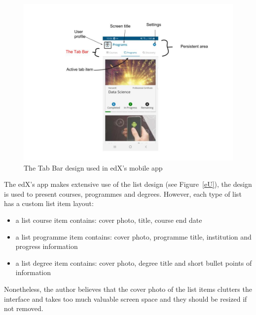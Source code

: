 \documentclass[version=last,fontsize=13pt]{scrartcl}
\begin{document}
		\begin{figure}[H]

			\centering	
			\includegraphics[scale = 0.5]{./imgs/tabBarE.jpg}
			\caption{The Tab Bar design used in edX's mobile app}
			\label{tB}

		\end{figure}

		The edX's app makes extensive use of the list design (see Figure~\ref{eU}), the design is used to present courses, programmes and degrees. However, each type of list has a custom list item layout:
		\begin{itemize}
			\item a list course item  contains: cover photo, title, course end date
			\item a list programme item contains: cover photo, programme title, institution and progress information
			\item a list degree item contains: cover photo, degree title and short bullet points of information
		\end{itemize}

		Nonetheless, the author believes that the cover photo of  the list items clutters the interface and takes too much valuable screen space and they should be resized if not removed.
\end{document}
